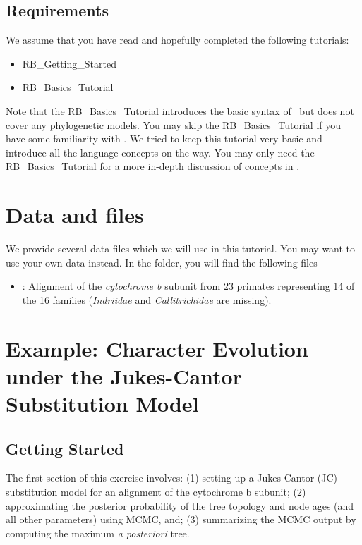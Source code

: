 \subsection*{Requirements}
We assume that you have read and hopefully completed the following tutorials:
\begin{itemize}
\item RB\_Getting\_Started
\item RB\_Basics\_Tutorial
\end{itemize}
Note that the RB\_Basics\_Tutorial introduces the basic syntax of \Rev~but does not cover any phylogenetic models.
You may skip the RB\_Basics\_Tutorial if you have some familiarity with \R.
We tried to keep this tutorial very basic and introduce all the language concepts on the way.
You may only need the RB\_Basics\_Tutorial for a more in-depth discussion of concepts in \Rev.


\section{Data and files}

We provide several data files which we will use in this tutorial.
You may want to use your own data instead.
In the  folder, you will find the following files
\begin{itemize}
\item
{}: Alignment of the \textit{cytochrome b} subunit from 23 primates representing 14 of the 16 families (\textit{Indriidae} and \textit{Callitrichidae} are missing).
\end{itemize}


%
%
\newpage
\FloatBarrier
\section{Example: Character Evolution under the Jukes-Cantor Substitution Model}

\bigskip
\subsection{Getting Started}

The first section of this exercise involves:
(1) setting up a Jukes-Cantor (JC) substitution model for an alignment of the cytochrome b subunit;
(2) approximating the posterior probability of the tree topology and node ages (and all other parameters) using MCMC, and; 
(3) summarizing the MCMC output by computing the maximum \textit{a posteriori} tree. 

